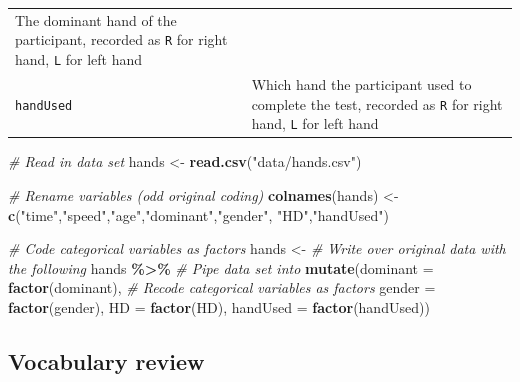 \documentclass[
]{report}
\newenvironment{Shaded}{\begin{snugshade}}{\end{snugshade}}
\newcommand{\CommentTok}[1]{\textcolor[rgb]{0.56,0.35,0.01}{\textit{#1}}}
\newcommand{\DataTypeTok}[1]{\textcolor[rgb]{0.13,0.29,0.53}{#1}}
\newcommand{\KeywordTok}[1]{\textcolor[rgb]{0.13,0.29,0.53}{\textbf{#1}}}
\newcommand{\NormalTok}[1]{#1}
\newcommand{\OperatorTok}[1]{\textcolor[rgb]{0.81,0.36,0.00}{\textbf{#1}}}
\newcommand{\StringTok}[1]{\textcolor[rgb]{0.31,0.60,0.02}{#1}}
\begin{document}
\begin{longtable}[]{@{}ll@{}}
\begin{minipage}[t]{0.72\columnwidth}
The dominant hand of the participant, recorded as \texttt{R} for right hand, \texttt{L} for left hand\strut
\end{minipage}\tabularnewline
\begin{minipage}[t]{0.22\columnwidth}\raggedright
\texttt{handUsed}\strut
\end{minipage} & \begin{minipage}[t]{0.72\columnwidth}\raggedright
Which hand the participant used to complete the test, recorded as \texttt{R} for right hand, \texttt{L} for left hand\strut
\end{minipage}\tabularnewline
\bottomrule
\end{longtable}

\begin{Shaded}
\begin{Highlighting}[]
\CommentTok{\# Read in data set}
\NormalTok{hands \textless{}{-}}\StringTok{ }\KeywordTok{read.csv}\NormalTok{(}\StringTok{"data/hands.csv"}\NormalTok{)}

\CommentTok{\# Rename variables (odd original coding)}
\KeywordTok{colnames}\NormalTok{(hands) \textless{}{-}}\StringTok{ }\KeywordTok{c}\NormalTok{(}\StringTok{"time"}\NormalTok{,}\StringTok{"speed"}\NormalTok{,}\StringTok{"age"}\NormalTok{,}\StringTok{"dominant"}\NormalTok{,}\StringTok{"gender"}\NormalTok{,}
                     \StringTok{"HD"}\NormalTok{,}\StringTok{"handUsed"}\NormalTok{) }

\CommentTok{\# Code categorical variables as factors}
\NormalTok{hands \textless{}{-}}\StringTok{ }\CommentTok{\# Write over original data with the following}
\StringTok{  }\NormalTok{hands }\OperatorTok{\%\textgreater{}\%}\StringTok{ }\CommentTok{\# Pipe data set into}
\StringTok{  }\KeywordTok{mutate}\NormalTok{(}\DataTypeTok{dominant =} \KeywordTok{factor}\NormalTok{(dominant), }\CommentTok{\# Recode categorical variables as factors}
         \DataTypeTok{gender =} \KeywordTok{factor}\NormalTok{(gender),}
         \DataTypeTok{HD =} \KeywordTok{factor}\NormalTok{(HD),}
         \DataTypeTok{handUsed =} \KeywordTok{factor}\NormalTok{(handUsed))}
\end{Highlighting}
\end{Shaded}

\hypertarget{vocabulary-review}{%
\subsection*{Vocabulary review}\label{vocabulary-review}}
\end{document}
